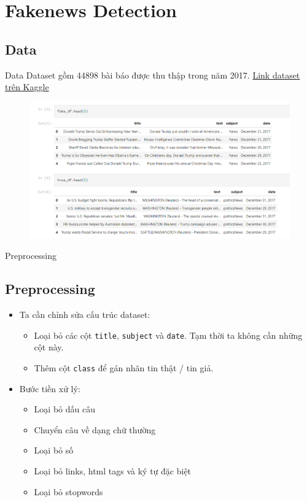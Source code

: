 \documentclass[aspectratio=169,xcolor=dvipsnames]{beamer}
\begin{document}
\section{Fakenews Detection}
\subsection{Data}
\begin{frame}{Data}
Dataset gồm 44898 bài báo được thu thập trong năm 2017. \href{https://www.kaggle.com/datasets/clmentbisaillon/fake-and-real-news-dataset}{Link dataset trên Kaggle}
\begin{figure}
\includegraphics[width=0.8\linewidth]{img/quick-glance-at-data.PNG}
\end{figure}
\end{frame}

\begin{frame}{Preprocessing}
\subsection{Preprocessing}
\begin{itemize}
\item Ta cần chỉnh sửa cấu trúc dataset:
\begin{itemize}
\item Loại bỏ các cột \texttt{title}, \texttt{subject} và \texttt{date}. Tạm thời ta không cần những cột này.
\item Thêm cột \texttt{class} để gán nhãn tin thật / tin giả.
\end{itemize}
\item Bước tiền xử lý:
\begin{itemize}
\item Loại bỏ dấu câu
\item Chuyển câu về dạng chữ thường
\item Loại bỏ số
\item Loại bỏ links, html tags và ký tự đặc biệt
\item Loại bỏ stopwords
\end{itemize}
\end{itemize}
\end{frame}
\end{document}
